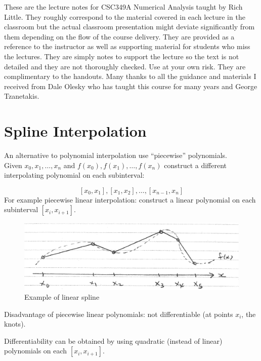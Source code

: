 \documentclass [titlepage,12pt,letter] {article}
\begin{document}
 


These are the lecture notes for CSC349A Numerical Analysis taught by
Rich Little. They roughly correspond to
the material covered in each lecture in the classroom but the actual
classroom presentation might deviate significantly from them depending
on the flow of the course delivery. They are provided as a reference to
the instructor as well as supporting material for students who miss
the lectures. They are simply notes to support the lecture so the text
is not detailed and they are not thoroughly checked. Use at your own
risk. They are complimentary to the handouts. Many thanks to all the
guidance and materials I received from Dale Olesky who has taught this
course for many years and George Tzanetakis. 




\section{Spline Interpolation} 

An alternative to polynomial interpolation use ``piecewise'' polynomials. 
\\
Given $x_0, x_1, \dots, x_n$ and $f(x_0), f(x_1), \dots, f(x_n)$ 
construct a different interpolating polynomial on each subinterval: 

\[
[x_0, x_1], [x_1, x_2], \dots, [x_{n-1}, x_n] 
\]
\noindent 
For example piecewise linear interpolation: construct a linear polynomial on each subinterval $[x_i, x_{i+1}]$. 
\\

\begin{figure} 
  \centering
  \includegraphics[scale=0.6]{linear_splines}
  \caption{Example of linear spline}
  \label{fig:linear}
\end{figure}



Disadvantage of piecewise linear polynomials: 
not differentiable (at points $x_i$, the knots). 

Differentiability can be obtained by using quadratic (instead of linear) 
polynomials on each $[x_i, x_{i+1}]$. 
\end{document}
